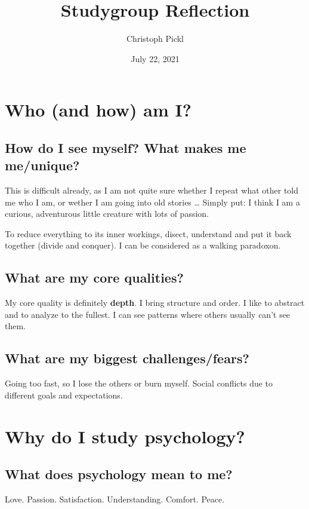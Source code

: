 \documentclass[12pt]{article}
\title{Studygroup Reflection}
\author{Christoph Pickl}
\date{July 22, 2021}
\begin{document}
 \maketitle


 \section{Who (and how) am I?}

 \subsection{How do I see myself? What makes me me/unique?}

 This is difficult already, as I am not quite sure whether I repeat what other told me who I am, or wether I am going into old stories \ldots
 Simply put: I think I am a curious, adventurous little creature with lots of passion.

 To reduce everything to its inner workings, disect, understand and put it back together (divide and conquer).
 I can be considered as a walking paradoxon.

 \subsection{What are my core qualities?}

 My core quality is definitely \textbf{depth}. I bring structure and order. I like to abstract and to analyze to the fullest.
 I can see patterns where others usually can't see them.

 \subsection{What are my biggest challenges/fears?}

 Going too fast, so I lose the others or burn myself. Social conflicts due to different goals and expectations.


 \section{Why do I study psychology?}

 \subsection{What does psychology mean to me?}

 Love. Passion. Satisfaction. Understanding. Comfort. Peace.
\end{document}
